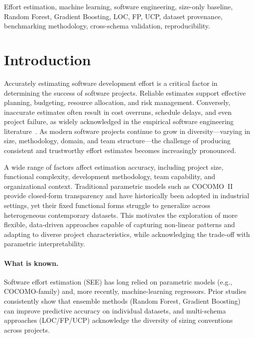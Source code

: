 \documentclass{ieeeaccess}
\begin{document}
\begin{keywords}
Effort estimation, machine learning, software engineering, size-only baseline, Random Forest, Gradient Boosting, LOC, FP, UCP, dataset provenance, benchmarking methodology, cross-schema validation, reproducibility.
\end{keywords}

\titlepgskip=-21pt

\maketitle

\section{Introduction}

Accurately estimating software development effort is a critical factor in determining the success of software projects. Reliable estimates support effective planning, budgeting, resource allocation, and risk management. Conversely, inaccurate estimates often result in cost overruns, schedule delays, and even project failure, as widely acknowledged in the empirical software engineering literature~\cite{boehm2000cocomo}. As modern software projects continue to grow in diversity—varying in size, methodology, domain, and team structure—the challenge of producing consistent and trustworthy effort estimates becomes increasingly pronounced.

A wide range of factors affect estimation accuracy, including project size, functional complexity, development methodology, team capability, and organizational context. Traditional parametric models such as COCOMO~II provide closed-form transparency and have historically been adopted in industrial settings, yet their fixed functional forms struggle to generalize across heterogeneous contemporary datasets. This motivates the exploration of more flexible, data-driven approaches capable of capturing non-linear patterns and adapting to diverse project characteristics, while acknowledging the trade-off with parametric interpretability.

\paragraph{What is known.}
Software effort estimation (SEE) has long relied on parametric models (e.g., COCOMO-family) and, more recently, machine-learning regressors. Prior studies consistently show that ensemble methods (Random Forest, Gradient Boosting) can improve predictive accuracy on individual datasets, and multi-schema approaches (LOC/FP/UCP) acknowledge the diversity of sizing conventions across projects.
\end{document}
